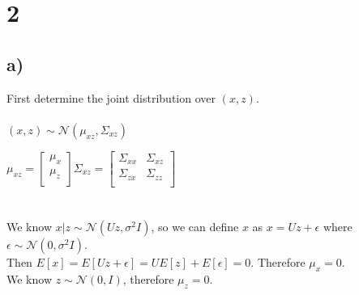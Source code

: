 \documentclass[11pt]{article}
\begin{document}
\section*{2}

\subsection*{a)}

First determine the joint distribution over $(x, z)$.
\\\\
$(x,z) \sim \mathcal{N}(\mu_{xz}, \Sigma_{xz})$

$
\mu_{xz} = 
\begin{bmatrix}
    \mu_x \\
    \mu_z \\
\end{bmatrix}
\Sigma_{xz} = 
\begin{bmatrix}
    \Sigma_{xx} & \Sigma_{xz} \\
    \Sigma_{zx} & \Sigma_{zz} \\
\end{bmatrix}
$
\\\\\\
We know $x|z \sim \mathcal{N}(Uz,\sigma^2 I)$, so we can define $x$ as $x = Uz + \epsilon$ where $\epsilon \sim \mathcal{N}(0, \sigma^2 I)$.\\
Then $E[x] = E[Uz + \epsilon] = UE[z] + E[\epsilon] = 0$. Therefore $\mu_x = 0$. \\

We know $z \sim \mathcal{N}(0,I)$, therefore $\mu_z = 0$. \\
\end{document}

